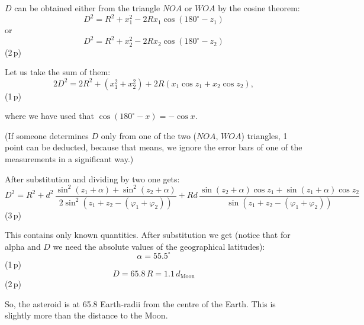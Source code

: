 \begin{description}
  $D$ can be obtained either from the triangle $NOA$ or $WOA$ by the cosine
  theorem:
  \[
    D^2 = R^2 + x_1^2 - 2Rx_1\cos(180^\circ - z_1) \tag{12.9}
  \]
  or
  \[
    D^2 = R^2 + x_2^2 - 2Rx_2\cos(180^\circ - z_2) \tag{12.10}
  \]
  \hfill(2\,p)

  Let us take the sum of them:
  \[
    2D^2 = 2R^2 + (x_1^2 + x_2^2) + 2R(x_1\cos z_1 + x_2\cos z_2),
    \tag{12.11}
  \]
  \hfill(1\,p)

  where we have used that $\cos(180^\circ - x) = -\cos x$.

  (If someone determines $D$ only from one of the two ($NOA$, $WOA$)
  triangles, 1 point can be deducted, because that means, we ignore the error
  bars of one of the measurements in a significant way.)

  After substitution and dividing by two one gets:
  \[
    D^2 = R^2
      + d^2\,\frac{\sin^2(z_1 + \alpha) + \sin^2(z_2 + \alpha)}
                  {2\sin^2(z_1 + z_2 - (\varphi_1 + \varphi_2))}
      + Rd\,\frac{\sin(z_2 + \alpha)\cos z_1 + \sin(z_1 + \alpha)\cos z_2}
                 {\sin(z_1 + z_2 - (\varphi_1 + \varphi_2))} \tag{12.12}
  \]
  \hfill(3\,p)

  This contains only known quantities. After substitution we get (notice that
  for alpha and $D$ we need the absolute values of the geographical latitudes):
  \[
    \alpha = 55.5^\circ
  \]
  \hfill(1\,p)
  \[
    D = 65.8\,R = 1.1\,d_{\mathrm{Moon}}
  \]
  \hfill(2\,p)

  So, the asteroid is at 65.8 Earth-radii from the centre of the Earth. This is
  slightly more than the distance to the Moon.
\end{description}

